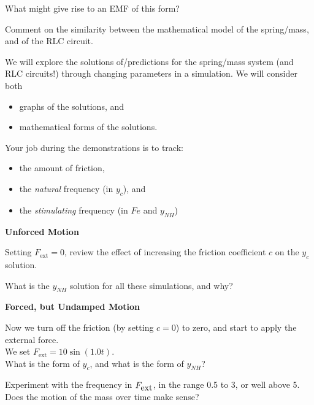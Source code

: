 What might give rise to an EMF of this form?
\vspace{1in}

\newpage

Comment on the similarity between the mathematical model of the
spring/mass, and of the RLC circuit.

\newpage


We will explore the solutions of/predictions for the spring/mass
system (and RLC circuits!) through changing parameters in a
simulation.  We will consider both
\begin{itemize}
\item graphs of the solutions, and 
\item mathematical forms of the solutions.
\end{itemize}

Your job during the demonstrations is to track:
\begin{itemize}
\item the amount of friction,
\item the {\em natural} frequency (in $y_c$), and
\item the {\em stimulating} frequency (in $Fe$ and $y_{NH}$)
\end{itemize}

\newpage

{\bf Unforced Motion}

Setting $F_{\mbox{ext}} = 0$, review the effect of
  increasing the friction coefficient $c$ on the $y_c$ solution.

\vfill

What is the $y_{NH}$ solution for all these simulations, and why?

\vfill

\newpage

{\bf Forced, but Undamped Motion}

Now we turn off the friction (by setting $c=0$) to zero, and
start to apply the external force. \\
We set $F_{\mbox{ext}} = 10 \sin(1.0 t)$.   \\
What is the form of $y_c$, and what is the form of $y_{NH}$?

\vfill

Experiment with the frequency in $F_{\mbox{ext}}$, in the range 0.5 to 3, or well
above 5.  Does the motion of the mass over time make sense?

\vfill

\newpage


